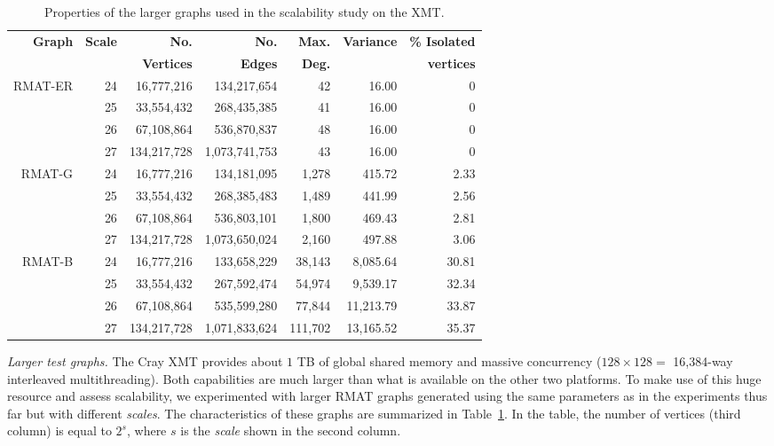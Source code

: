 \documentclass{article}
\begin{document}
\begin{table}
\begin{footnotesize}
\centering
\begin{tabular}{|r|r|r|r|r|r|r|}
\hline
\textbf{Graph}	& \textbf{Scale}	&	\textbf{No. }	&	\textbf{No. }	&	\textbf{Max.}	&	
                   \textbf{Variance}	&	\textbf{\% Isolated}	\\  
& &\textbf{Vertices}	& \textbf{Edges} &	\textbf{Deg.}	& &	\textbf{vertices}	\\ \hline \hline                   
\multirow{4}{*}{RMAT-ER} & 24	&	 16,777,216 	&	 134,217,654 	&	 42 		&	 16.00 		& 0	\\ 
& 25	&	 33,554,432 	&	 268,435,385 	&	 41 		&	 16.00 		& 0   	\\ 
& 26	&	 67,108,864 	&	 536,870,837 	&	 48 		&	 16.00 		& 0   	\\ 
& 27	&	 134,217,728 	&	 1,073,741,753 	&	 43 		&	 16.00 		& 0   	\\ \hline
\multirow{4}{*}{RMAT-G}	& 24	&	 16,777,216 	&	 134,181,095 	&	 1,278 		&	 415.72 	& 2.33 	\\ 
& 25	&	 33,554,432 	&	 268,385,483 	&	 1,489 		&	 441.99 	& 2.56 	\\ 
& 26	&	 67,108,864 	&	 536,803,101 	&	 1,800 		&	 469.43 	& 2.81 	\\ 
& 27	&	 134,217,728 	&	 1,073,650,024 	&	 2,160 		&	 497.88 	& 3.06 	\\ \hline
\multirow{4}{*}{RMAT-B} & 24	&	 16,777,216 	&	 133,658,229 	&	 38,143 	&	 8,085.64 	& 30.81 \\ 
& 25	&	 33,554,432 	&	 267,592,474 	&	 54,974 	&	 9,539.17 	& 32.34 \\ 
& 26	&	 67,108,864 	&	 535,599,280 	&	 77,844 	&	 11,213.79 	& 33.87 \\ 
& 27	&	 134,217,728 	&	 1,071,833,624 	&	 111,702 	&	 13,165.52 	& 35.37 \\ \hline
\end{tabular}
\caption{\small Properties of the larger graphs used in the scalability study on the XMT.}
\label{t:LargeScale}
\end{footnotesize}
\end{table}

{\em Larger test graphs. } 
The Cray XMT provides about $1$ TB of global shared memory and
massive  concurrency ($128 \times 128 = $ 16,384-way interleaved multithreading).
Both capabilities are much larger than what is available on the other two platforms.
To make use of this huge resource and assess scalability, 
we experimented with larger RMAT graphs generated using the same parameters as
in the experiments thus far but with different {\em scales}.
The characteristics of these graphs are summarized in Table~\ref{t:LargeScale}. 
In the table, the number of vertices (third column) is equal to $2^s$, where $s$ is the {\em scale}
shown in the second column.
\end{document}
